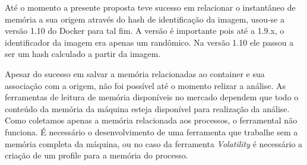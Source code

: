 \documentclass[conference]{IEEEtran}
\begin{document}
Até o momento a presente proposta teve sucesso em relacionar o instantâneo de memória a sua origem através do hash de identificação da imagem, usou-se a versão 1.10 do Docker para tal fim. 
%
A versão é importante pois até a 1.9.x, o identificador da imagem era apenas um randômico. Na versão 1.10 ele passou a ser um hash calculado a partir da imagem.

Apesar do sucesso em salvar a memória relacionadas ao container e sua associação com a origem, não foi possível até o momento relizar a análise. 
%
As ferramentas de leitura de memória disponíveis no mercado dependem que todo o conteúdo da memória da máquina esteja disponível para realização da análise. 
%
Como coletamos apenas a memória relacionada aos processos, o ferramental não funciona. 
%
É necessário o desenvolvimento de uma ferramenta que trabalhe sem a memória completa da máquina, ou no caso da ferramenta \textit{Volatility} é necessário a criação de um profile para a memória do processo.



\end{document}
